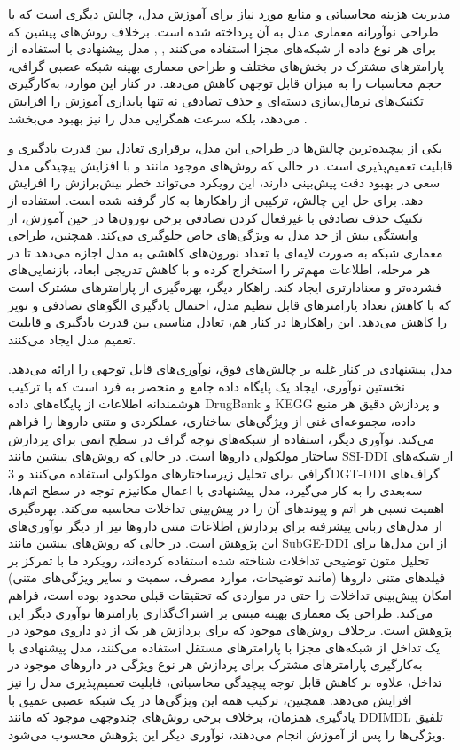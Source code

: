 مدیریت هزینه محاسباتی و منابع مورد نیاز برای آموزش مدل، چالش دیگری است که با طراحی نوآورانه معماری مدل به آن پرداخته شده است. برخلاف روش‌های پیشین که برای هر نوع داده از شبکه‌های مجزا استفاده می‌کنند \cite{ref_ryu2018}, \cite{ref_lin2022}, مدل پیشنهادی با استفاده از پارامترهای مشترک در بخش‌های مختلف و طراحی معماری بهینه شبکه عصبی گرافی، حجم محاسبات را به میزان قابل توجهی کاهش می‌دهد. در کنار این موارد، به‌کارگیری تکنیک‌های نرمال‌سازی دسته‌ای و حذف تصادفی نه تنها پایداری آموزش را افزایش می‌دهد، بلکه سرعت همگرایی مدل را نیز بهبود می‌بخشد \cite{ref_nyamabo2021}.

یکی از پیچیده‌ترین چالش‌ها در طراحی این مدل، برقراری تعادل بین قدرت یادگیری و قابلیت تعمیم‌پذیری است. در حالی که روش‌های موجود مانند \cite{ref_he2023} و \cite{ref_shi2024} با افزایش پیچیدگی مدل سعی در بهبود دقت پیش‌بینی دارند، این رویکرد می‌تواند خطر بیش‌برازش را افزایش دهد. برای حل این چالش، ترکیبی از راهکارها به کار گرفته شده است. استفاده از تکنیک حذف تصادفی با غیرفعال کردن تصادفی برخی نورون‌ها در حین آموزش، از وابستگی بیش از حد مدل به ویژگی‌های خاص جلوگیری می‌کند. همچنین، طراحی معماری شبکه به صورت لایه‌ای با تعداد نورون‌های کاهشی به مدل اجازه می‌دهد تا در هر مرحله، اطلاعات مهم‌تر را استخراج کرده و با کاهش تدریجی ابعاد، بازنمایی‌های فشرده‌تر و معنادارتری ایجاد کند. راهکار دیگر، بهره‌گیری از پارامترهای مشترک است که با کاهش تعداد پارامترهای قابل تنظیم مدل، احتمال یادگیری الگوهای تصادفی و نویز را کاهش می‌دهد. این راهکارها در کنار هم، تعادل مناسبی بین قدرت یادگیری و قابلیت تعمیم مدل ایجاد می‌کنند.

مدل پیشنهادی در کنار غلبه بر چالش‌های فوق، نوآوری‌های قابل توجهی را ارائه می‌دهد. نخستین نوآوری، ایجاد یک پایگاه داده جامع و منحصر به فرد است که با ترکیب هوشمندانه اطلاعات از پایگاه‌های داده DrugBank و KEGG و پردازش دقیق هر منبع داده، مجموعه‌ای غنی از ویژگی‌های ساختاری، عملکردی و متنی داروها را فراهم می‌کند. نوآوری دیگر، استفاده از شبکه‌های توجه گراف در سطح اتمی برای پردازش ساختار مولکولی داروها است. در حالی که روش‌های پیشین مانند SSI-DDI \cite{ref_nyamabo2021} از شبکه‌های گرافی برای تحلیل زیرساختارهای مولکولی استفاده می‌کنند و 3DGT-DDI \cite{ref_he2023} گراف‌های سه‌بعدی را به کار می‌گیرد، مدل پیشنهادی با اعمال مکانیزم توجه در سطح اتم‌ها، اهمیت نسبی هر اتم و پیوندهای آن را در پیش‌بینی تداخلات محاسبه می‌کند. بهره‌گیری از مدل‌های زبانی پیشرفته برای پردازش اطلاعات متنی داروها نیز از دیگر نوآوری‌های این پژوهش است. در حالی که روش‌های پیشین مانند SubGE-DDI \cite{ref_shi2024} از این مدل‌ها برای تحلیل متون توضیحی تداخلات شناخته شده استفاده کرده‌اند، رویکرد ما با تمرکز بر فیلدهای متنی داروها (مانند توضیحات، موارد مصرف، سمیت و سایر ویژگی‌های متنی) امکان پیش‌بینی تداخلات را حتی در مواردی که تحقیقات قبلی محدود بوده است، فراهم می‌کند. طراحی یک معماری بهینه مبتنی بر اشتراک‌گذاری پارامترها نوآوری دیگر این پژوهش است. برخلاف روش‌های موجود که برای پردازش هر یک از دو داروی موجود در یک تداخل از شبکه‌های مجزا با پارامترهای مستقل استفاده می‌کنند، مدل پیشنهادی با به‌کارگیری پارامترهای مشترک برای پردازش هر نوع ویژگی در داروهای موجود در تداخل، علاوه بر کاهش قابل توجه پیچیدگی محاسباتی، قابلیت تعمیم‌پذیری مدل را نیز افزایش می‌دهد.  همچنین، ترکیب همه این ویژگی‌ها در یک شبکه عصبی عمیق با یادگیری همزمان، برخلاف برخی روش‌های چندوجهی موجود که مانند DDIMDL \cite{ref_deng2020} تلفیق ویژگی‌ها را پس از آموزش انجام می‌دهند، نوآوری دیگر این پژوهش محسوب می‌شود.
